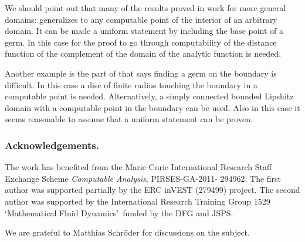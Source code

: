 \documentclass{eptcs-modified}
\begin{document}
		We should point out that many of the results proved in  work for more general domains:
		 generalizes to any computable point of the interior of an arbitrary domain.
		It can be made a uniform statement by including the base point of a germ.
		In this case for the proof to go through computability of the distance function of the complement of the domain of the analytic function is needed.

		Another example is the part of  that says finding a germ on the boundary is difficult.
		In this case a disc of finite radius touching the boundary in a computable point is needed.
		Alternatively, a simply connected bounded Lipshitz domain with a computable point in the boundary can be used.
		Also in this case it seems reasonable to assume that a uniform statement can be proven.
		
		
		
		

	\subsubsection*{Acknowledgements.}
		The work has benefited from the Marie Curie International Research Staff Exchange Scheme \emph{Computable Analysis}, PIRSES-GA-2011- 294962. The first author was supported partially by the ERC inVEST (279499) project. The second author was supported by the International Research Training Group 1529 \lq Mathematical Fluid Dynamics\rq\ funded by the DFG and JSPS.

We are grateful to Matthias Schr\"oder for discussions on the subject.
\end{document}

